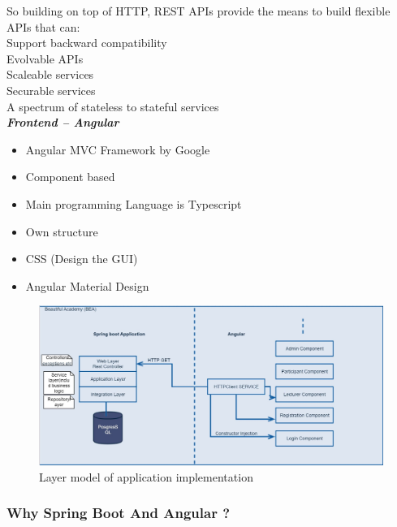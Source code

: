 \documentclass{scrartcl}
\begin{document}
So building on top of HTTP, REST APIs provide the means to build flexible APIs that can:\\
Support backward compatibility\\
Evolvable APIs\\

Scaleable services\\

Securable services\\

A spectrum of stateless to stateful services\\


\textbf{\textit{Frontend – Angular}}

\begin{itemize}
	\item	Angular MVC Framework by Google
	\item	Component based
	\item	Main programming Language is Typescript
	\item	Own structure
	\item	CSS (Design the GUI)
	\item   Angular Material Design

\end{itemize}
\begin{figure}[H]
\centering
\includegraphics[width = 130mm]{layer.JPG}
\caption{Layer model of application implementation}
\label{layers}
\end{figure}

\subsubsection{Why Spring Boot And Angular ?}
\end{document}
